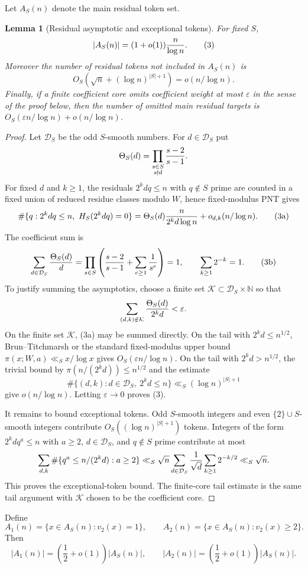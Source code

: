 \documentclass[11pt]{article}
\newtheorem{lemma}[theorem]{Lemma}
\newcommand{\eps}{\varepsilon}
\begin{document}
Let $A_S(n)$ denote the main residual token set.

\begin{lemma}[Residual asymptotic and exceptional tokens]\label{lem:residual}
For fixed $S$,
\[
  |A_S(n)|=(1+o(1)){n\over\log n}.                  \tag{3}
\]
Moreover the number of residual tokens not included in $A_S(n)$ is
\[
  O_S\!\left(\sqrt n+(\log n)^{|S|+1}\right)
  =o(n/\log n).
\]
Finally, if a finite coefficient core omits coefficient weight at most
$\eps$ in the sense of the proof below, then the number of omitted main
residual targets is $O_S(\eps n/\log n)+o(n/\log n)$.
\end{lemma}

\begin{proof}
Let $\mathcal D_S$ be the odd $S$-smooth numbers.  For
$d\in\mathcal D_S$ put
\[
  \Theta_S(d)=\prod_{\substack{s\in S\\s\nmid d}}{s-2\over s-1}.
\]
For fixed $d$ and $k\ge1$, the residuals $2^kdq\le n$ with $q\notin S$ prime
are counted in a fixed union of reduced residue classes modulo $W$, hence
fixed-modulus PNT gives
\[
  \#\{q:2^kdq\le n,\ H_S(2^kdq)=0\}
  =
  \Theta_S(d){n\over 2^kd\log n}
  +o_{d,k}(n/\log n).                                \tag{3a}
\]
The coefficient sum is
\[
  \sum_{d\in\mathcal D_S}{\Theta_S(d)\over d}
  =
  \prod_{s\in S}\left({s-2\over s-1}+\sum_{e\ge1}{1\over s^e}\right)=1,
  \qquad
  \sum_{k\ge1}2^{-k}=1.                              \tag{3b}
\]
To justify summing the asymptotics, choose a finite set
$\mathcal K\subset \mathcal D_S\times\mathbb N$ so that
\[
  \sum_{(d,k)\notin\mathcal K}{\Theta_S(d)\over 2^kd}<\eps.
\]
On the finite set $\mathcal K$, (3a) may be summed directly.  On the tail with
$2^kd\le n^{1/2}$, Brun--Titchmarsh or the standard fixed-modulus upper bound
$\pi(x;W,a)\ll_S x/\log x$ gives $O_S(\eps n/\log n)$.  On the tail with
$2^kd>n^{1/2}$, the trivial bound by $\pi(n/(2^kd))\le n^{1/2}$ and the
estimate
\[
  \#\{(d,k):d\in\mathcal D_S,\ 2^kd\le n\}
  \ll_S(\log n)^{|S|+1}
\]
give $o(n/\log n)$.  Letting $\eps\to0$ proves (3).

It remains to bound exceptional tokens.  Odd $S$-smooth integers and even
$\{2\}\cup S$-smooth integers contribute
$O_S((\log n)^{|S|+1})$ tokens.  Integers of the form
$2^kdq^a\le n$ with $a\ge2$, $d\in\mathcal D_S$, and $q\notin S$ prime
contribute at most
\[
  \sum_{d,k} \#\{q^a\le n/(2^kd):a\ge2\}
  \ll_S
  \sqrt n\sum_{d\in\mathcal D_S}{1\over\sqrt d}
  \sum_{k\ge1}2^{-k/2}
  \ll_S\sqrt n.
\]
This proves the exceptional-token bound.  The finite-core tail estimate is
the same tail argument with $\mathcal K$ chosen to be the coefficient core.
\end{proof}
Define
\[
  A_1(n)=\{x\in A_S(n):v_2(x)=1\},\qquad
  A_2(n)=\{x\in A_S(n):v_2(x)\ge2\}.
\]
Then
\[
  |A_1(n)|=\left(\frac12+o(1)\right)|A_S(n)|,
  \qquad
  |A_2(n)|=\left(\frac12+o(1)\right)|A_S(n)|.        \tag{4}
\]
\end{document}
